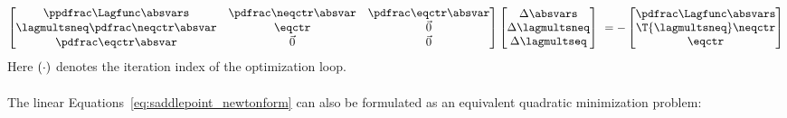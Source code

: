\documentclass[../main.tex]{subfiles}
\begin{document}
\begin{align}\label{eq:saddlepoint_newtonform}
\begin{bmatrix}
\it{\PPLagfuncBYabsvars}                & \it{\PneqctrBYabsvars} & \it{\PeqctrBYabsvars} \\
\it{\lagmultsneq}\it{\PneqctrBYabsvars} & \it{\eqctr}            & \vec{0}               \\
\it{\PeqctrBYabsvars}                   & \vec{0}                & \vec{0}
\end{bmatrix}
	\begin{bmatrix}
	\incrabsvars \\
	\incrlagmultsneq \\
	\incrlagmultseq
	\end{bmatrix}\
	=
    -\begin{bmatrix}
		\it{\PLagfuncBYabsvars} \\
		\T{\it{\lagmultsneq}} \it{\neqctr} \\
		\it{\eqctr}
		\end{bmatrix}
\end{align}
Here $\it{(\cdot)}$ denotes the iteration index of the optimization loop.\\
~\\
The linear Equations~\eqref{eq:saddlepoint_newtonform} can also be formulated as an equivalent quadratic minimization problem:
\end{document}
